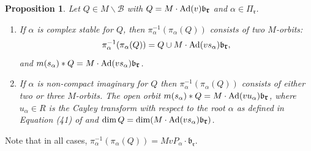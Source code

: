 \documentclass[12pt]{amsart}
\numberwithin{equation}{section}
\newtheorem{prop}[thm]{Proposition}
\theoremstyle{remark}
\theoremstyle{definition}
\newcommand{\fr}{\mbox{${\mathfrak r}$}}
\newcommand{\fb}{\mbox{${\mathfrak b}$}}
\newcommand{\Ad}{{\rm Ad}}
\newcommand{\B}{\mathcal{B}}
\newcommand{\ms}{m(s_{\alpha})}
\begin{document}
\begin{prop}\label{p:stableandnc}
Let $Q\in M\backslash\B$ with $Q=M\cdot \Ad(v)\fb_{\fr}$ and $\alpha\in \Pi_{\fr}$.
\begin{enumerate}
\item If $\alpha$ is complex stable for $Q$, then $\pi_{\alpha}^{-1}(\pi_{\alpha}(Q))$ consists of two $M$-orbits:
$$
\pi_{\alpha}^{-1}(\pi_{\alpha}(Q))=Q\cup M\cdot \Ad(vs_{\alpha})\fb_{\fr},
$$
and $\ms*Q= M\cdot \Ad(vs_{\alpha})\fb_{\fr}$. 
\item If $\alpha$ is non-compact imaginary for $Q$ then $\pi_{\alpha}^{-1}(\pi_{\alpha}(Q))$ consists of either two or three $M$-orbits. The open orbit
$\ms*Q=M\cdot \Ad(vu_{\alpha})\fb_{\fr}$, where $u_{\alpha}\in R$ is the Cayley transform with respect to the root $\alpha$ as defined in Equation (41) of \cite{CEexp} and $\dim Q=\dim (M\cdot \Ad(vs_{\alpha})\fb_{\fr})$.   

\end{enumerate}


\end{prop}
\noindent Note that in all cases, $\pi_{\alpha}^{-1}(\pi_{\alpha}(Q))=MvP_{\alpha}\cdot \fb_{\fr}.$
\end{document}
